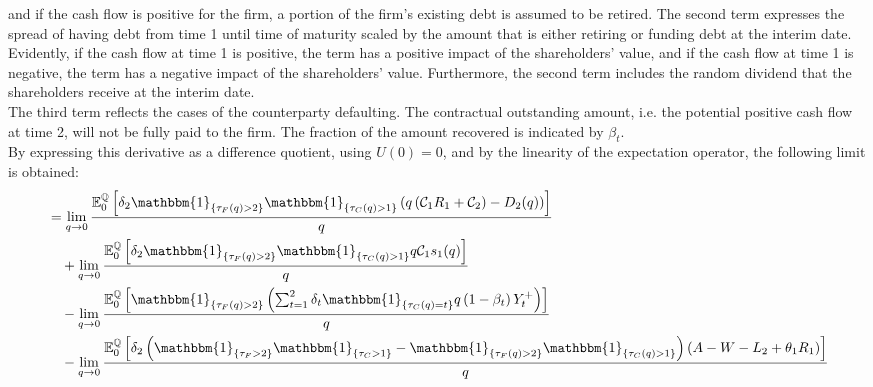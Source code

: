 \documentclass[main.tex]{subfiles}
\begin{document}
        and if the cash flow is positive for the firm, a portion of the firm's existing debt is assumed to be retired.
        The second term expresses the spread of having debt from time 1 until time of maturity scaled by the amount that is either retiring or funding debt at the interim date.
        Evidently, if the cash flow at time 1 is positive, the term has a positive impact of the shareholders' value,
        and if the cash flow at time 1 is negative, the term has a negative impact of the shareholders' value.
        Furthermore, the second term includes the random dividend that the shareholders receive at the interim date.
        \\
        The third term reflects the cases of the counterparty defaulting.
        The contractual outstanding amount, i.e. the potential positive cash flow at time 2, will not be fully paid to the firm.
        The fraction of the amount recovered is indicated by $\beta_{t}$.
        \\
        By expressing this derivative as a difference quotient, using $U(0)=0$,
        and by the linearity of the expectation operator,
        the following limit is obtained:
        \begin{align}
            &=
            \lim_{q \rightarrow 0}
            \frac{
                \mathbb{E}_{0}^{\rnmeasure}\left[
                    \delta_{2} \mathbbm{1}_{\{\tau_{F}(q)>2\}} \mathbbm{1}_{\{\tau_{C}(q)>1\}}
                    \left(
                        q\left(\mathcal{C}_{1} R_{1} + \mathcal{C}_{2}\right)
                        - D_{2}(q)
                    \right)
                \right]
            }{
                q
            }
            \nonumber
            \\
            &\quad+
            \lim_{q \rightarrow 0}
            \frac{
                \mathbb{E}_{0}^{\rnmeasure}\left[
                    \delta_2 \mathbbm{1}_{\{\tau_{F}(q)>2\}} \mathbbm{1}_{\{\tau_{C}(q)>1\}}
                    q\mathcal{C}_{1} s_1(q)
                \right]
            }{
                q
            }
            \nonumber
            \\
            &\quad-
            \lim_{q \rightarrow 0}
            \frac{
                \mathbb{E}_{0}^{\rnmeasure}\left[
                    \mathbbm{1}_{\{\tau_{F}(q)>2\}}
                    \left(
                        \sum_{t=1}^{2} \delta_{t} \mathbbm{1}_{\{\tau_{C}(q)=t\}}q\left(1-\beta_t\right)Y_{t}^{+}
                    \right)
                \right]
            }{
                q
            }
            \nonumber
            \\
            &\quad-
            \lim_{q \rightarrow 0}
            \frac{
                \mathbb{E}_{0}^{\rnmeasure}\left[
                    \delta_{2} \left(
                    \mathbbm{1}_{\{\tau_{F}>2\}} \mathbbm{1}_{\{\tau_{C}>1\}} - \mathbbm{1}_{\{\tau_{F}(q)>2\}} \mathbbm{1}_{\{\tau_{C}(q)>1\}}\right)
                    \left(
                        A - W
                        - L_{2}
                        + \theta_{1}R_{1}
                    \right)
                \right]
            }{
                q
            }
            \label{eqn:G-debt-multi-step-1}
        \end{align}
\end{document}

